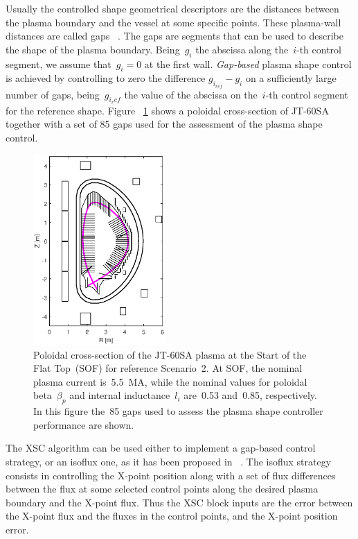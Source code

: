  Usually the controlled shape geometrical descriptors are the distances between the plasma boundary and the vessel at some specific points. These plasma-wall distances are called gaps ~\cite{Ambrosino:TCST2008}. The gaps are segments that can be used to describe the shape of the plasma boundary. Being~$g_i$ the abscissa along the~$i$-th control segment, we assume that~$g_i=0$ at the first wall. \emph{Gap-based} plasma shape control is achieved by controlling to zero the difference $g_{i_{ref}}-g_i$ on a sufficiently large number of gaps, being~$g_{i_ref}$ the value of the abscissa on the~$i$-th control segment for the reference shape. Figure ~\ref{figure:85_gaps} shows a poloidal cross-section of JT-60SA together with a set of 85 gaps used for the assessment of the plasma shape control.
 \smallskip
 
 \begin{figure}[h]
 	\begin{center}
 		\includegraphics[width=0.45\textwidth]{Chp3/85_gaps_2.eps}
 	\end{center}\caption{Poloidal cross-section of the JT-60SA plasma at the Start of the Flat Top~(SOF) for reference Scenario~2. At SOF, the nominal plasma current is~5.5~MA, while the nominal values for poloidal beta~$\beta_p$ and internal inductance~$l_i$ are~0.53 and~0.85, respectively. In this figure the~85 gaps used to assess the plasma shape controller performance are shown.}\label{figure:85_gaps}
 \end{figure}
 
  The XSC algorithm can be used either to implement a gap-based control strategy, or an isoflux one, as it has been proposed in ~\cite{NCruz}. The isoflux strategy consists in controlling the X-point position along with a set of flux differences between the flux at some selected control points along the desired plasma boundary and the X-point flux. Thus the XSC block inputs are the error between the X-point flux and the fluxes in the control points, and the X-point position error.
\smallskip


